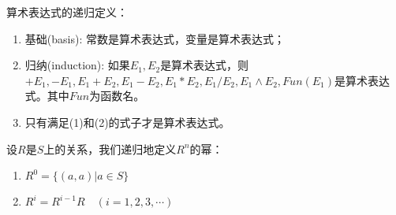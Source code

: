 \begin{example} \label{exr} 算术表达式的递归定义：
	\begin{enumerate}
		\item 基础(basis): 常数是算术表达式，变量是算术表达式；
		\item 归纳(induction): 如果$E_1,E_2$是算术表达式，则$+E_1,-E_1,E_1+E_2,E_1-E_2,E_1\ast E_2,E_1/E_2,E_1\land {E_2},Fun(E_1)$是算术表达式。其中$Fun$为函数名。
		\item 只有满足(1)和(2)的式子才是算术表达式。
	\end{enumerate}
\end{example}

\begin{definition}
	设$R$是$S$上的关系，我们递归地定义$R^n$的幂：
	\begin{enumerate}
		\item $R^0 = \{(a,a)|a\in S\}$
		\item $R^i = R^{i-1}R\quad (i=1,2,3,\cdots)$
	\end{enumerate}
\end{definition}

